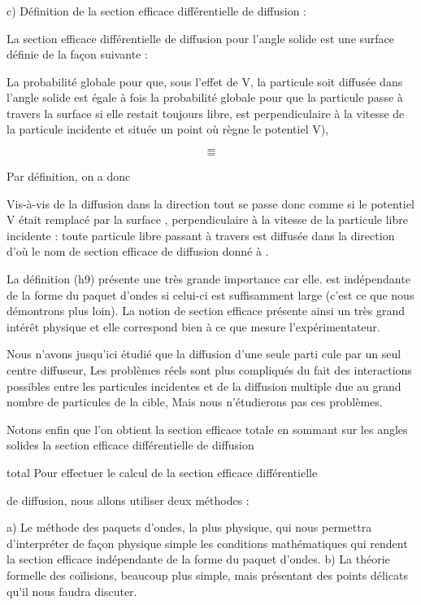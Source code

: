 {{{\subsubsection{}%
c) Définition de la section efficace différentielle de diffusion :

La section efficace différentielle de diffusion pour
l'angle solide  est une surface  définie de la façon suivante :

La probabilité globale pour que, sous l'effet de V, la particule soit diffusée
dans l'angle solide  est égale à  fois
la probabilité globale pour que la particule passe à travers la surface
 si elle restait toujours libre,  est perpendiculaire à la
vitesse de la particule incidente et située  un point  où règne le
potentiel V),

\[
\tag{49}=
\]
\[
\tag{50}=
\]

Par définition, on a donc

Vis-à-vis de la diffusion dans la direction  tout se passe donc comme
si le potentiel V était remplacé par la surface , perpendiculaire
à la vitesse de la particule libre incidente : toute particule libre passant à
travers  est diffusée dans la direction  d'où le nom de
section efficace de diffusion donné à .

La définition (h9) présente une très grande importance car elle.
est indépendante de la forme du paquet d'ondes si celui-ci est suffisamment large
(c'est ce que nous démontrons plus loin). La notion de section
efficace présente ainsi un très grand intérêt physique et elle correspond
bien à ce que mesure l'expérimentateur.

Nous n'avons jusqu'ici étudié que la diffusion d'une seule parti
cule par un seul centre diffuseur, Les problèmes réels sont plus compliqués
du fait des interactions possibles entre les particules incidentes et de
la diffusion multiple due au grand nombre de particules de la cible, Mais
nous n'étudierons pas ces problèmes.

Notons enfin que l'on obtient la section efficace totale en sommant sur les angles
solides la section efficace différentielle de diffusion

total
Pour effectuer le calcul de la section efficace différentielle

de diffusion, nous allons utiliser deux méthodes :


a) Le méthode des paquets d'ondes, la plus physique, qui nous permettra
d'interpréter de façon physique simple les conditions mathématiques qui
rendent la section efficace indépendante de la forme du paquet d'ondes.
b) La théorie formelle des coïlisions, beaucoup plus simple, mais présentant des
points délicats qu'il nous faudra discuter.

}}}
